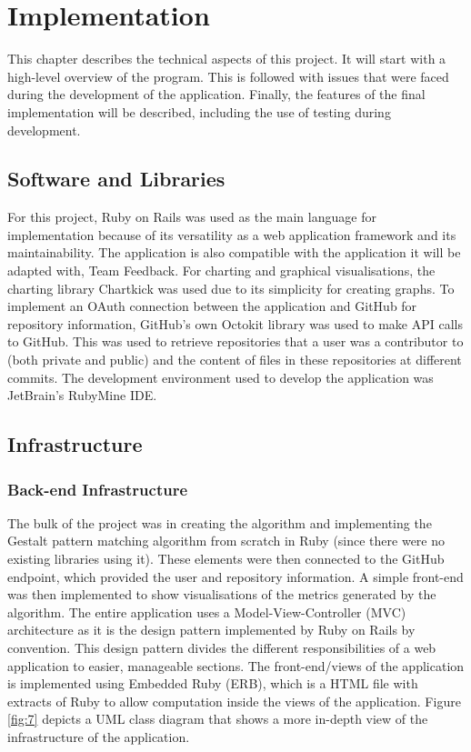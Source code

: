 \chapter{Implementation}
This chapter describes the technical aspects of this project. It will start with a high-level overview of the program. This is followed with issues that were faced during the development of the application. Finally, the features of the final implementation will be described, including the use of testing during development.

\section{Software and Libraries}

For this project, Ruby on Rails was used as the main language for implementation because of its versatility as a web application framework and its maintainability. The application is also compatible with the application it will be adapted with, Team Feedback. For charting and graphical visualisations, the charting library Chartkick was used due to its simplicity for creating graphs. To implement an OAuth connection between the application and GitHub for repository information, GitHub's own Octokit library was used to make API calls to GitHub. This was used to retrieve repositories that a user was a contributor to (both private and public) and the content of files in these repositories at different commits. The development environment used to develop the application was JetBrain's RubyMine IDE. 

\section{Infrastructure}

\subsection{Back-end Infrastructure}

The bulk of the project was in creating the algorithm and implementing the Gestalt pattern matching algorithm from scratch in Ruby (since there were no existing libraries using it). These elements were then connected to the GitHub endpoint, which provided the user and repository information. A simple front-end was then implemented to show visualisations of the metrics generated by the algorithm. The entire application uses a Model-View-Controller (MVC) architecture as it is the design pattern implemented by Ruby on Rails by convention. This design pattern divides the different responsibilities of a web application to easier, manageable sections. The front-end/views of the application is implemented using Embedded Ruby (ERB), which is a HTML file with extracts of Ruby to allow computation inside the views of the application. Figure \ref{fig:7} depicts a UML class diagram that shows a more in-depth view of the infrastructure of the application. 

